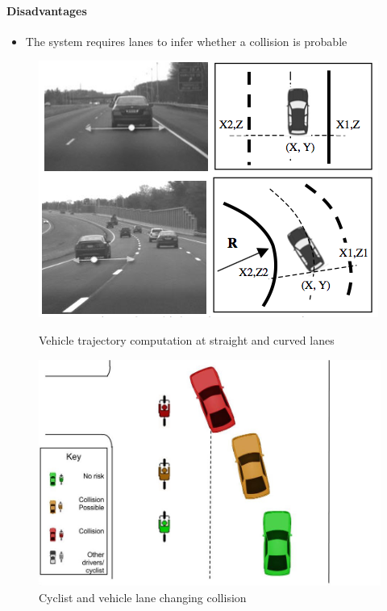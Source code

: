 \documentclass[]{report}
\begin{document}
\paragraph{Disadvantages}
\begin{itemize}
\item The system requires lanes to infer whether a collision is probable	 	
\end{itemize}

\begin{figure}[h]
\centering
	\begin{minipage}{0.49\textwidth}
		\centering
		\includegraphics[scale=0.4]{figures/research_paper_figures/trajectory_multi-cue}
		\caption{Vehicle trajectory computation at straight and curved lanes \citep{multi-cue} }
		\label{fig:traj_multi-cue_image1}
	\end{minipage}\hfill
	\begin{minipage}{0.49\textwidth}
		\centering
		\includegraphics[scale=0.2]{figures/collision_avoidance_figures/Vehicle_changing_lane_into_the_path_of_a_cyclist}
		\caption{Cyclist and vehicle lane changing collision}
		\label{fig:change_lane_image}
	\end{minipage}
\end{figure}
\end{document}
